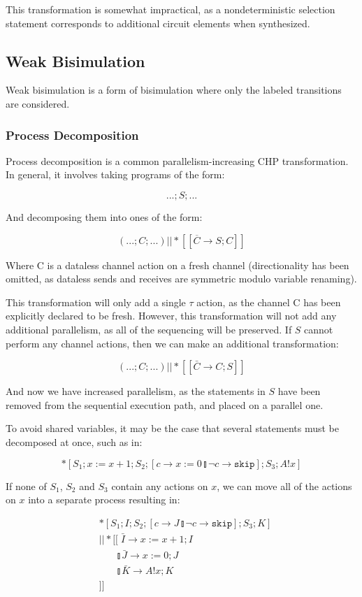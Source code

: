 \documentclass[times, 10pt]{article}
\begin{document}
This transformation is somewhat impractical, as a nondeterministic selection
statement corresponds to additional circuit elements when synthesized.

\subsection{Weak Bisimulation}

Weak bisimulation is a form of bisimulation where only the labeled transitions
are considered.

\subsubsection{Process Decomposition}

Process decomposition is a common parallelism-increasing CHP transformation.  In
general, it involves taking programs of the form:

\[
...;S;...
\]

And decomposing them into ones of the form:

\[
(...;C;...) || *[[\overline{C} \rightarrow S; C]]
\]

Where C is a dataless channel action on a fresh channel (directionality has been
omitted, as dataless sends and receives are symmetric modulo variable renaming).

This transformation will only add a single $\tau$ action, as the channel C has
been explicitly declared to be fresh.  However, this transformation will not
add any additional parallelism, as all of the sequencing will be preserved. If
$S$ cannot perform any channel actions, then we can make an additional
transformation:

\[
(...;C;...) || *[[\bar{C} \rightarrow C; S]]
\]

And now we have increased parallelism, as the statements in $S$ have been
removed from the sequential execution path, and placed on a parallel one.

To avoid shared variables, it may be the case that several statements must be
decomposed at once, such as in:

\[
*[S_1; x := x + 1; S_2; [ c \rightarrow x := 0 \talloblong \lnot c \rightarrow \texttt{skip} ]; S_3; A!x ] 
\]

If none of $S_1$, $S_2$ and $S_3$ contain any actions on $x$, we can
move all of the actions on $x$ into a separate process resulting in:

\begin{align*}
& *[S_1; I; S_2; [ c \rightarrow J \talloblong \lnot c \rightarrow \texttt{skip} ]; S_3; K] \\
& || *[[\;\bar{I} \rightarrow x := x + 1; I \\
&\;\;\;\;\;\;\talloblong \bar{J} \rightarrow x := 0; J \\
&\;\;\;\;\;\;\talloblong \bar{K} \rightarrow  A!x; K \\
&]]
\end{align*}
\end{document}
